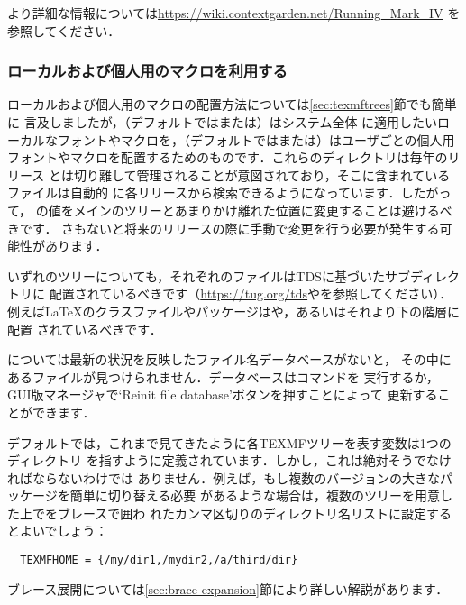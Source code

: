 \documentclass[uplatex,dvipdfmx,tombow]{jsarticle}
\begin{document}
より詳細な情報については\url{https://wiki.contextgarden.net/Running_Mark_IV}%
を参照してください．

\subsubsection{ローカルおよび個人用のマクロを利用する}
\label{sec:local-personal-macros}

ローカルおよび個人用のマクロの配置方法については\ref{sec:texmftrees}節でも簡単に
言及しましたが，（デフォルトではまたは）はシステム全体
に適用したいローカルなフォントやマクロを，（デフォルトではまたは）はユーザごとの個人用
フォントやマクロを配置するためのものです．これらのディレクトリは毎年のリリース
とは切り離して管理されることが意図されており，そこに含まれているファイルは自動的
に各\TL リリースから検索できるようになっています．したがって，%
の値をメインの\TL ツリーとあまりかけ離れた位置に変更することは避けるべきです．
さもないと将来のリリースの際に手動で変更を行う必要が発生する可能性があります．

いずれのツリーについても，それぞれのファイルはTDSに基づいたサブディレクトリに
配置されているべきです（\url{https://tug.org/tds}やを参照してください）．例えば\LaTeX のクラスファイルやパッケージはや，あるいはそれより下の階層に配置
されているべきです．

については最新の状況を反映したファイル名データベースがないと，
その中にあるファイルが見つけられません．データベースはコマンドを
実行するか，GUI版\TL マネージャで`Reinit file database'ボタンを押すことによって
更新することができます．

デフォルトでは，これまで見てきたように各TEXMFツリーを表す変数は1つのディレクトリ
を指すように定義されています．しかし，これは絶対そうでなければならないわけでは
ありません．例えば，もし複数のバージョンの大きなパッケージを簡単に切り替える必要
があるような場合は，複数のツリーを用意した上でをブレースで囲わ
れたカンマ区切りのディレクトリ名リストに設定するとよいでしょう：
%
\begin{verbatim}
  TEXMFHOME = {/my/dir1,/mydir2,/a/third/dir}
\end{verbatim}
%
ブレース展開については\ref{sec:brace-expansion}節により詳しい解説があります．
\end{document}
